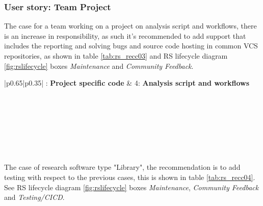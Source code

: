 \subsubsection{User story: Team Project}

The case for a team working on a project on analysis script and workflows, there is an increase in responsibility, as such it's recommended to add support that includes the reporting and solving bugs and source code hosting in common VCS repositories, as shown in table \ref{tab:rs_recc03} and RS lifecycle diagram \ref{fig:rslifecycle} boxes \textit{Maintenance} and \textit{Community Feedback}.

\begin{center}
    \tabletail{\hline}
    \label{tab:rs_recc03}
    \small
    \begin{supertabular}{|p{0.65\linewidth}|p{0.35\linewidth}|} : \textbf{Project specific code} &
    4: \textbf{Analysis script and workflows} \\ \hline \hline

     \\ \hline
     \\ \hline
     \\ \hline
     \\ \hline
     \\ \hline
     \\ \hline

\end{supertabular}
\end{center}

The case of research software type "Library", the recommendation is to add testing with respect to the previous cases, this is shown in table \ref{tab:rs_recc04}.
See RS lifecycle diagram \ref{fig:rslifecycle} boxes \textit{Maintenance}, \textit{Community Feedback} and \textit{Testing/CICD}.

